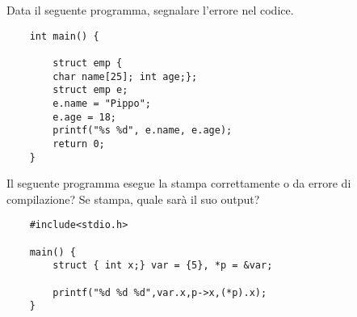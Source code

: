 \documentclass[a4paper,12pt] {exam}
\begin{document}
\begin{questions}
\question {} Data il seguente programma, segnalare l'errore nel codice.
\begin{lstlisting}
	int main() {
		
		struct emp {
		char name[25]; int age;};
		struct emp e;
		e.name = "Pippo";
		e.age = 18;
		printf("%s %d", e.name, e.age);
		return 0;
	}
\end{lstlisting}
\question {} Il seguente programma esegue la stampa correttamente o da errore di compilazione? Se stampa, quale sarà il suo output?
\begin{lstlisting}
	#include<stdio.h>
	
	main() { 
		struct { int x;} var = {5}, *p = &var;
		
		printf("%d %d %d",var.x,p->x,(*p).x); 
	}
	
\end{lstlisting}
\end{questions}
\end{document}
